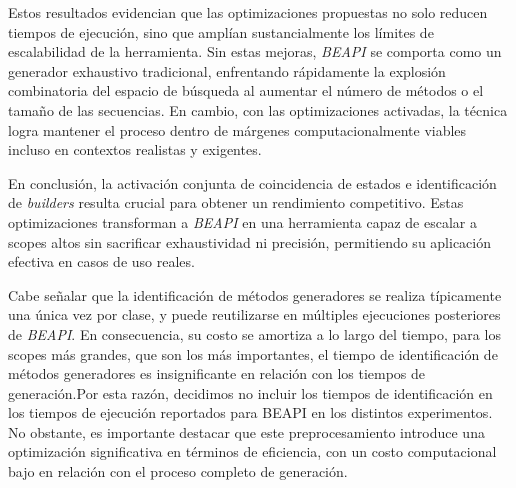 
Estos resultados evidencian que las optimizaciones propuestas no solo reducen tiempos de ejecución, 
sino que amplían sustancialmente los límites de escalabilidad de la herramienta. Sin estas mejoras, 
\emph{BEAPI} se comporta como un generador exhaustivo tradicional, enfrentando rápidamente la explosión 
combinatoria del espacio de búsqueda al aumentar el número de métodos o el tamaño de las secuencias. 
En cambio, con las optimizaciones activadas, la técnica logra mantener el proceso dentro de márgenes 
computacionalmente viables incluso en contextos realistas y exigentes.

En conclusión, la activación conjunta de coincidencia de estados e identificación de \emph{builders} 
resulta crucial para obtener un rendimiento competitivo. Estas optimizaciones transforman a \emph{BEAPI} 
en una herramienta capaz de escalar a scopes altos sin sacrificar exhaustividad ni precisión, 
permitiendo su aplicación efectiva en casos de uso reales.


Cabe señalar que la identificación de métodos generadores se realiza típicamente una única vez por clase, 
y puede reutilizarse en múltiples ejecuciones posteriores de \emph{BEAPI}. En consecuencia, su costo se 
amortiza a lo largo del tiempo, para los scopes más grandes, que son los más importantes, el tiempo de identificación de 
métodos generadores es insignificante en relación con los tiempos de generación.Por esta razón, decidimos no incluir los tiempos de identificación 
en los tiempos de ejecución reportados para \textsf{BEAPI} en los distintos experimentos.
No obstante, es importante destacar que este preprocesamiento introduce una optimización significativa en 
términos de eficiencia, con un costo computacional bajo en relación con el proceso completo de generación. 

